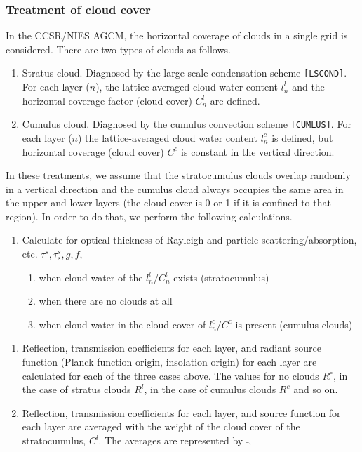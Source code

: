 \hypertarget{treatment-of-cloud-cover}{%
\subsubsection{Treatment of cloud cover}\label{treatment-of-cloud-cover}}

In the CCSR/NIES AGCM, the horizontal coverage of clouds in
a single grid is considered. There are two types of clouds as follows.

\begin{enumerate}
\def\labelenumi{\arabic{enumi}.}
\item
  Stratus cloud. Diagnosed by the large scale condensation scheme
  \texttt{{[}LSCOND{]}}. For each layer (\(n\)), the
  lattice-averaged cloud water content \(l^l_n\) and the horizontal
  coverage factor (cloud cover) \(C^l_n\) are defined.
\item
  Cumulus cloud. Diagnosed by the cumulus convection scheme
  \texttt{{[}CUMLUS{]}}. For each layer (\(n\)) the
  lattice-averaged cloud water content \(l^c_n\) is defined, but
  horizontal coverage (cloud cover) \(C^c\) is constant in the
  vertical direction.
\end{enumerate}

In these treatments, we assume that the stratocumulus clouds overlap
randomly in a vertical direction and the cumulus cloud always
occupies the same area in the upper and lower layers (the
cloud cover is 0 or 1 if it is confined to that region). In order to do that, we
perform the following calculations.

\begin{enumerate}
\def\labelenumi{\arabic{enumi}.}
\item
  Calculate for optical thickness of Rayleigh and particle scattering/absorption, etc.
  \(\tau^s, \tau_s^s, g, f\),

  \begin{enumerate}
  \def\labelenumii{\arabic{enumii}.}
  \item
    when cloud water of the \(l^l_n/C^l_n\) exists (stratocumulus)
  \item
    when there are no clouds at all
  \item
    when cloud water in the cloud cover of \(l^c_n/C^c\) is present
    (cumulus clouds)
  \end{enumerate}
\end{enumerate}


\begin{enumerate}
\def\labelenumi{\arabic{enumi}.}
\setcounter{enumi}{1}
\item
  Reflection, transmission coefficients for each layer, and radiant
  source function (Planck function origin, insolation origin) for each layer are
  calculated for each of the three cases above. The values for no clouds
  \(R^\circ\), in the case of stratus clouds \(R^l\), in the case of
  cumulus clouds \(R^c\) and so on.
\item
  Reflection, transmission coefficients for each layer, and source
  function for each layer are averaged with the weight of the cloud cover of the
  stratocumulus, \(C^l\). The averages are represented by \(\bar{}\),
\end{enumerate}

